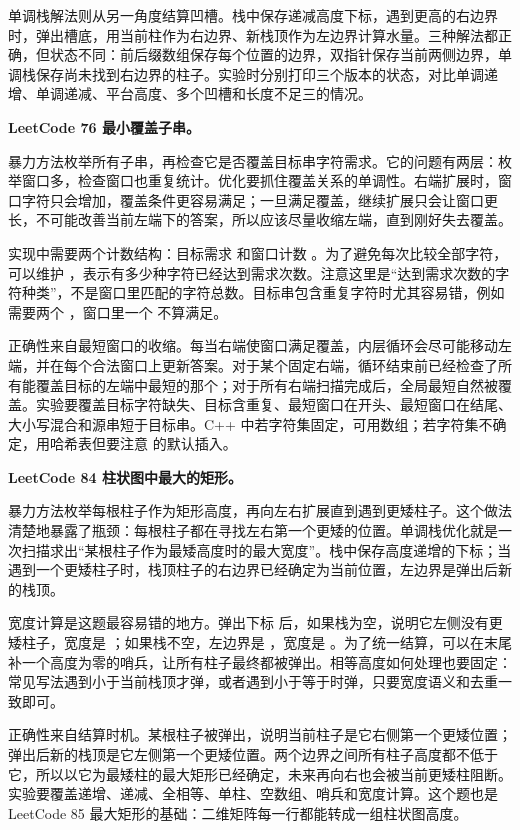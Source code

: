 单调栈解法则从另一角度结算凹槽。栈中保存递减高度下标，遇到更高的右边界时，弹出槽底，用当前柱作为右边界、新栈顶作为左边界计算水量。三种解法都正确，但状态不同：前后缀数组保存每个位置的边界，双指针保存当前两侧边界，单调栈保存尚未找到右边界的柱子。实验时分别打印三个版本的状态，对比单调递增、单调递减、平台高度、多个凹槽和长度不足三的情况。

\noindent\textbf{LeetCode 76 最小覆盖子串。}

暴力方法枚举所有子串，再检查它是否覆盖目标串字符需求。它的问题有两层：枚举窗口多，检查窗口也重复统计。优化要抓住覆盖关系的单调性。右端扩展时，窗口字符只会增加，覆盖条件更容易满足；一旦满足覆盖，继续扩展只会让窗口更长，不可能改善当前左端下的答案，所以应该尽量收缩左端，直到刚好失去覆盖。

实现中需要两个计数结构：目标需求  和窗口计数 。为了避免每次比较全部字符，可以维护 ，表示有多少种字符已经达到需求次数。注意这里是“达到需求次数的字符种类”，不是窗口里匹配的字符总数。目标串包含重复字符时尤其容易错，例如  需要两个 ，窗口里一个  不算满足。

正确性来自最短窗口的收缩。每当右端使窗口满足覆盖，内层循环会尽可能移动左端，并在每个合法窗口上更新答案。对于某个固定右端，循环结束前已经检查了所有能覆盖目标的左端中最短的那个；对于所有右端扫描完成后，全局最短自然被覆盖。实验要覆盖目标字符缺失、目标含重复、最短窗口在开头、最短窗口在结尾、大小写混合和源串短于目标串。C++ 中若字符集固定，可用数组；若字符集不确定，用哈希表但要注意  的默认插入。

\noindent\textbf{LeetCode 84 柱状图中最大的矩形。}

暴力方法枚举每根柱子作为矩形高度，再向左右扩展直到遇到更矮柱子。这个做法清楚地暴露了瓶颈：每根柱子都在寻找左右第一个更矮的位置。单调栈优化就是一次扫描求出“某根柱子作为最矮高度时的最大宽度”。栈中保存高度递增的下标；当遇到一个更矮柱子时，栈顶柱子的右边界已经确定为当前位置，左边界是弹出后新的栈顶。

宽度计算是这题最容易错的地方。弹出下标  后，如果栈为空，说明它左侧没有更矮柱子，宽度是 ；如果栈不空，左边界是 ，宽度是 。为了统一结算，可以在末尾补一个高度为零的哨兵，让所有柱子最终都被弹出。相等高度如何处理也要固定：常见写法遇到小于当前栈顶才弹，或者遇到小于等于时弹，只要宽度语义和去重一致即可。

正确性来自结算时机。某根柱子被弹出，说明当前柱子是它右侧第一个更矮位置；弹出后新的栈顶是它左侧第一个更矮位置。两个边界之间所有柱子高度都不低于它，所以以它为最矮柱的最大矩形已经确定，未来再向右也会被当前更矮柱阻断。实验要覆盖递增、递减、全相等、单柱、空数组、哨兵和宽度计算。这个题也是 LeetCode 85 最大矩形的基础：二维矩阵每一行都能转成一组柱状图高度。

